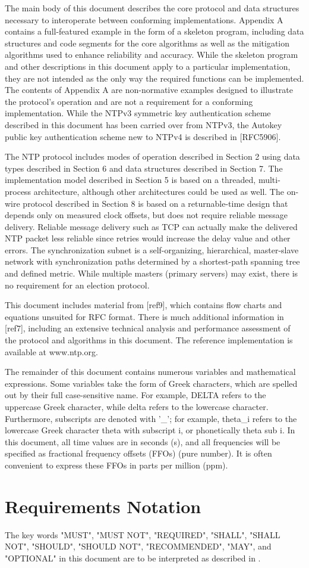 The main body of this document describes the core protocol and data
structures necessary to interoperate between conforming
implementations. Appendix A contains a full-featured example in the
form of a skeleton program, including data structures and code
segments for the core algorithms as well as the mitigation algorithms
used to enhance reliability and accuracy. While the skeleton program
and other descriptions in this document apply to a particular
implementation, they are not intended as the only way the required
functions can be implemented. The contents of Appendix A are non-normative
examples designed to illustrate the protocol’s operation
and are not a requirement for a conforming implementation. While the
NTPv3 symmetric key authentication scheme described in this document
has been carried over from NTPv3, the Autokey public key
authentication scheme new to NTPv4 is described in [RFC5906].

The NTP protocol includes modes of operation described in Section 2
using data types described in Section 6 and data structures described
in Section 7. The implementation model described in Section 5 is
based on a threaded, multi-process architecture, although other
architectures could be used as well. The on-wire protocol described
in Section 8 is based on a returnable-time design that depends only
on measured clock offsets, but does not require reliable message
delivery. Reliable message delivery such as TCP \cite{RFC0793} can
actually make the delivered NTP packet less reliable since retries
would increase the delay value and other errors. The synchronization
subnet is a self-organizing, hierarchical, master-slave network with
synchronization paths determined by a shortest-path spanning tree and
defined metric. While multiple masters (primary servers) may exist,
there is no requirement for an election protocol.

This document includes material from [ref9], which contains flow
charts and equations unsuited for RFC format. There is much
additional information in [ref7], including an extensive technical
analysis and performance assessment of the protocol and algorithms in
this document. The reference implementation is available at
www.ntp.org.

The remainder of this document contains numerous variables and
mathematical expressions. Some variables take the form of Greek
characters, which are spelled out by their full case-sensitive name.
For example, DELTA refers to the uppercase Greek character, while
delta refers to the lowercase character. Furthermore, subscripts are
denoted with ’\_’; for example, theta\_i refers to the lowercase Greek
character theta with subscript i, or phonetically theta sub i. In
this document, all time values are in seconds (s), and all
frequencies will be specified as fractional frequency offsets (FFOs)
(pure number). It is often convenient to express these FFOs in parts
per million (ppm).

\section{Requirements Notation}

The key words "MUST", "MUST NOT", "REQUIRED", "SHALL", "SHALL NOT",
"SHOULD", "SHOULD NOT", "RECOMMENDED", "MAY", and "OPTIONAL" in this
document are to be interpreted as described in \cite{RFC2119}.

